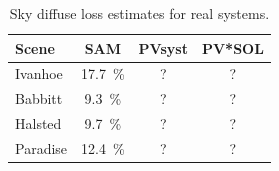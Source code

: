 \documentclass[twocolumn,10pt]{asme2ej}
\begin{document}
\begin{table}[h!]
\begin{center}
\begin{tabular}{lccc}
Scene & SAM & PVsyst & PV*SOL \\
\hline
Ivanhoe & 17.7~\% & ? & ? \\
Babbitt  & 9.3~\% & ? & ? \\
Halsted  & 9.7~\% & ? & ? \\
Paradise & 12.4~\% & ? & ? \\
\end{tabular}
\caption{Sky diffuse loss estimates for real systems.}
\label{tab:diffuse_loss_systems}
\end{center}
\end{table}


\begin{figure}[h!]
\begin{center}

\end{center}
\end{figure}
\end{document}
